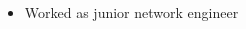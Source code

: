 \documentclass[10pt,a4paper,ragged2e,withhyper]{altacv}
\begin{document}
\begin{paracol}{2}
\divider

\begin{itemize}
\item Worked as junior network engineer
\end{itemize}





\newpage




\end{paracol}
\end{document}
